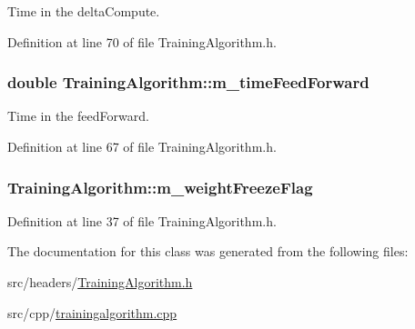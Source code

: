 Time in the delta\+Compute. 



Definition at line 70 of file Training\+Algorithm.\+h.

\subsubsection[{\texorpdfstring{m\+\_\+time\+Feed\+Forward}{m_timeFeedForward}}]{\setlength{\rightskip}{0pt plus 5cm}double Training\+Algorithm\+::m\+\_\+time\+Feed\+Forward\hspace{0.3cm}{\ttfamily [private]}}\hypertarget{classTrainingAlgorithm_a5c1b96170a1ea80c6f717195dcfb88f1}{}\label{classTrainingAlgorithm_a5c1b96170a1ea80c6f717195dcfb88f1}


Time in the feed\+Forward. 



Definition at line 67 of file Training\+Algorithm.\+h.

\subsubsection[{\texorpdfstring{m\+\_\+weight\+Freeze\+Flag}{m_weightFreezeFlag}}]{ Training\+Algorithm\+::m\+\_\+weight\+Freeze\+Flag\hspace{0.3cm}{\ttfamily [private]}}\hypertarget{classTrainingAlgorithm_a19383d774b744bb32c092c7892c92998}{}\label{classTrainingAlgorithm_a19383d774b744bb32c092c7892c92998}


Definition at line 37 of file Training\+Algorithm.\+h.



The documentation for this class was generated from the following files\+:\begin{DoxyCompactItemize}
\item 
src/headers/\hyperlink{TrainingAlgorithm_8h}{Training\+Algorithm.\+h}\item 
src/cpp/\hyperlink{trainingalgorithm_8cpp}{trainingalgorithm.\+cpp}\end{DoxyCompactItemize}
